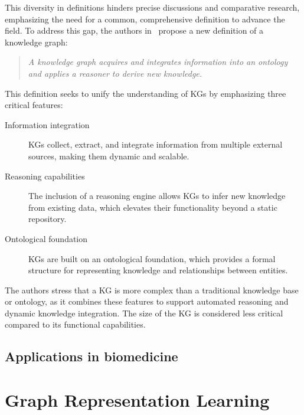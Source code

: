 This diversity in definitions hinders precise discussions and comparative research, emphasizing the need for a common, comprehensive definition to advance the field. To address this gap, the authors in~\cite{Ehrlinger2016TowardsAD} propose a new definition of a knowledge graph: 
\begin{center}
    \begin{quote}
        \textit{A knowledge graph acquires and integrates information into an ontology and applies a reasoner to derive new knowledge.}
    \end{quote}
\end{center}This definition seeks to unify the understanding of KGs by emphasizing three critical features:
\begin{description}
    \item[Information integration] KGs collect, extract, and integrate information from multiple external sources, making them dynamic and scalable.
    \item[Reasoning capabilities] The inclusion of a reasoning engine allows KGs to infer new knowledge from existing data, which elevates their functionality beyond a static repository.
    \item[Ontological foundation] KGs are built on an ontological foundation, which provides a formal structure for representing knowledge and relationships between entities.
\end{description}

The authors stress that a KG is more complex than a traditional knowledge base or ontology, as it combines these features to support automated reasoning and dynamic knowledge integration. The size of the KG is considered less critical compared to its functional capabilities.

\subsection{Applications in biomedicine}\label{kgs:biomed}

\section{Graph Representation Learning}